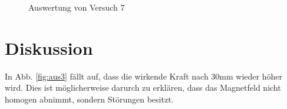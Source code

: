 \documentclass[12pt,a4paper,titlepage,headinclude,bibtotoc]{scrartcl}
\begin{document}
\begin{figure}[h]
\centering
{}
\caption{Auswertung von Versuch 7}
\label{fig:aus7}
\end{figure}

\section{Diskussion}
\label{sec:diskussion}
In Abb. \ref{fig:aus3} fällt auf, dass die wirkende Kraft nach 30mm wieder höher wird.
Dies ist möglicherweise darurch zu erklären, dass das Magnetfeld nicht homogen abnimmt, sondern Störungen besitzt.



\end{document}
